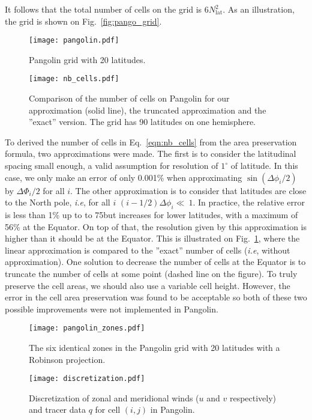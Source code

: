 It follows that the total number of cells on the grid is $6N_{\text{lat}}^2$. As
an illustration, the grid is shown on Fig.~\ref{fig:pango_grid}.
\begin{figure}
  \begin{minipage}[t]{0.49\linewidth}
    \centering
    \texttt{[image: pangolin.pdf]}
    \caption{Pangolin grid with 20 latitudes.}
    \label{fig:pango_grid}
  \end{minipage} 
  \hfill
  \begin{minipage}[t]{0.49\linewidth}
    \centering
    \texttt{[image: nb\_cells.pdf]}
    \caption{
      Comparison of the number of cells on Pangolin for our
      approximation (solid line), the truncated approximation and the ''exact''
    version.  The grid has 90 latitudes on one hemisphere.}
    \label{fig:nb_cells}
  \end{minipage}
\end{figure}

To derived the number of cells in Eq.~\eqref{eqn:nb_cells} from the area
preservation formula, two approximations were made. The first is to consider the
latitudinal spacing small enough, a valid assumption for
resolution of $1^{\circ}$ of latitude. In this case, we only make an error of
only 0.001\% when approximating $\sin(\Delta\phi_i/2)$ by $\Delta\Phi_i/2$ for
all $i$.
The other approximation is to consider that latitudes are close to the North
pole, \textit{i.e}, for all $i$ $(i-1/2)\Delta\phi_i \ll~1$. 
In practice, the relative error is less than 1\% up to to 75\degree but
increases for lower latitudes, with a maximum of 56\% at the Equator. On top of
that, the resolution given by this approximation is higher than it should be at
the Equator. This is illustrated on Fig.~\ref{fig:nb_cells}, where the linear
approximation is compared to the ''exact'' number of cells (\textit{i.e}, without
approximation). One solution to decrease the number of cells at the Equator is
to truncate the number of cells at some point (dashed line on the figure). 
To truly preserve the cell areas, we should also use a variable cell height.
However, the error in the cell area preservation was found to be acceptable so
both of these two possible improvements were not implemented in Pangolin.

\begin{figure}
  \begin{minipage}{0.5\linewidth}
    \centering
    \texttt{[image: pangolin\_zones.pdf]}
    \caption{The six identical zones in the Pangolin grid with 20 latitudes with
      a \gls{Robinson projection}.}
    \label{fig:pango_zones}
  \end{minipage}
  \hfill
  \begin{minipage}{0.4\linewidth}
    \centering
    \texttt{[image: discretization.pdf]}
    \caption{Discretization of zonal and meridional winds ($u$ and $v$ 
    respectively) and tracer data $q$ for cell $(i,j)$ in Pangolin.}
    \label{fig:d-grid}
  \end{minipage}
\end{figure}

